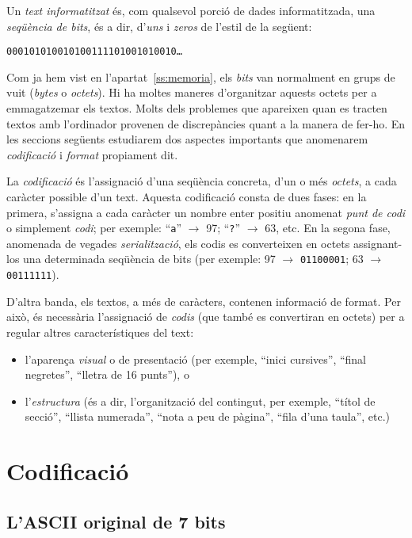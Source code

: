 Un \emph{text informatitzat} és, com qualsevol porció de dades
informatitzada, una \emph{seqüència de bits}, és a dir, d'\emph{uns} i
\emph{zeros} de l'estil de la següent:

\begin{center}
 \texttt{000101010010100111101001010010\ldots}
\end{center}

Com ja hem vist en l'apartat~\ref{ss:memoria}, els \emph{bits} van
normalment en grups de vuit (\emph{bytes} o \emph{octets}). Hi ha
moltes maneres d'organitzar aquests octets per a emmagatzemar els
textos.  Molts dels problemes que apareixen quan es tracten textos amb
l'ordinador provenen de discrepàncies quant a la manera de fer-ho.
En les seccions següents estudiarem dos aspectes importants que
anomenarem \emph{codificació} i \emph{format} propiament dit. 

La \emph{codificació} és l'assignació d'una seqüència concreta, d'un o més
\emph{octets}, a cada caràcter possible d'un text. Aquesta codificació consta de dues fases: en la
primera, s'assigna a cada caràcter un nombre enter positiu anomenat
\emph{punt de codi} o simplement \emph{codi}; per exemple:
``\texttt{a}'' $\to$ 97; ``\texttt{?}'' $\to$ 63, etc. En la segona
fase, anomenada de vegades \emph{serialització}, els codis es
converteixen en octets assignant-los una determinada seqüència de bits
(per exemple: 97 $\to$ \texttt{01100001}; 63 $\to$ \texttt{00111111}).


D'altra banda, els textos, a més de caràcters, contenen informació de
format. Per això, és necessària l'assignació de \emph{codis} (que
també es convertiran en octets) per a regular altres característiques
del text:
\begin{itemize}
  \item l'aparença \emph{visual} o de
    presentació (per exemple, ``inici cursives'', ``final negretes'',
    ``lletra de 16 punts''), o
  \item l'\emph{estructura} (és a dir, l'organització del contingut,
    per exemple, ``títol de secció'', ``llista numerada'', ``nota a
    peu de pàgina'', ``fila d'una taula'', etc.)
\end{itemize}

\section{Codificació}

\subsection{L'ASCII original de 7 bits}

